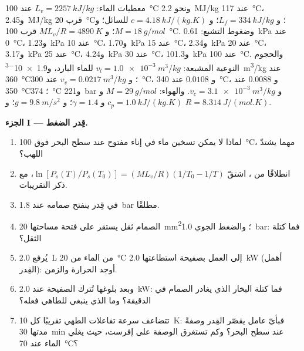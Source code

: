 \begin{problem}
\label{pb:b1:phase-changes:1}
معطيات الماء: $L_v = \qty{2257}{kJ/kg}$ عند \qty{100}{\degreeCelsius} ونحو
\qty{2.2}{MJ/kg} عند \qty{117}{\degreeCelsius}، و\qty{2.45}{MJ/kg} قرب
\qty{20}{\degreeCelsius}؛ و $L_f = \qty{334}{kJ/kg}$؛ و $c = \qty{4.18}{kJ/(kg.K)}$
للسائل؛ و $M = \qty{18}{g/mol}$؛ و $ML_v/R = \qty{4890}{K}$ قرب
\qty{100}{\degreeCelsius}. وضغوط التشبع: \qty{0.61}{kPa}
عند \qty{0}{\degreeCelsius}، و\qty{1.23}{kPa} عند \qty{10}{\degreeCelsius}، و\qty{1.70}{kPa} عند \qty{15}{\degreeCelsius}،
و\qty{2.34}{kPa} عند \qty{20}{\degreeCelsius}، و\qty{3.17}{kPa} عند \qty{25}{\degreeCelsius}، و\qty{4.24}{kPa}
عند \qty{30}{\degreeCelsius}، و\qty{101.3}{kPa} عند \qty{100}{\degreeCelsius}.
والحجوم النوعية المشبعة: $v_l = \qty{1.0e-3}{m^3/kg}$ للماء البارد،
و\qty{1.9e-3}{m^3/kg} عند \qty{360}{\degreeCelsius}؛ و $v_v = \qty{0.0217}{m^3/kg}$
عند \qty{300}{\degreeCelsius}، و $0.0108$ عند \qty{340}{\degreeCelsius}، و $0.0088$
عند \qty{350}{\degreeCelsius}؛  \qty{374}{\degreeCelsius}
و\qty{221}{bar} و $v_c = \qty{3.1e-3}{m^3/kg}$. والهواء: $M = \qty{29}{g/mol}$ و $c_p =
\qty{1.0}{kJ/(kg.K)}$ و $\gamma = 1.4$؛ و $g = \qty{9.8}{m/s^2}$؛ و $R =
\qty{8.314}{J/(mol.K)}$.

\medskip
\noindent\textbf{الجزء I --- قِدر الضغط.}
\begin{enumerate}
  \item لماذا لا يمكن تسخين ماء في إناء مفتوح عند سطح البحر فوق
        \qty{100}{\degreeCelsius}، مهما يشتدّ اللهب؟
  \item انطلاقًا من ، اشتقّ
        $\ln[P_s(T)/P_s(T_0)] = (ML_v/R)(1/T_0 - 1/T)$، مع ذكر
        التقريبات.
  \item {} في قِدر ينفتح صمامه عند \qty{1.8}{bar}
        مطلقًا.
  \item الصمام ثقل يستقر على فتحة مساحتها \qty{20}{mm^2}؛
        والضغط الجوي \qty{1.0}{bar}: فما كتلة الثقل؟
  \item يُرفع \qty{2.0}{L} من الماء من \qty{20}{\degreeCelsius} إلى
         العمل بصفيحة استطاعتها \qty{2.0}{kW} (أهمل القِدر):
        أوجد الحرارة والزمن.
  \item وبعد بلوغها تُترك الصفيحة عند \qty{2.0}{kW}: فما كتلة البخار
        الذي يغادر الصمام في الدقيقة؟ وما الذي ينبغي للطاهي فعله؟
  \item تتضاعف سرعة تفاعلات الطهي تقريبًا كل \qty{10}{K}:
        فبأيّ عامل يقصّر القِدر وصفةً مدتها \qty{30}{min} عند سطح البحر؟
        وكم تستغرق الوصفة على إفرست، حيث
        يغلي الماء عند \qty{70}{\degreeCelsius}؟
\end{enumerate}


\end{problem}
